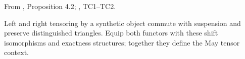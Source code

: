 \begin{definition}
\label{sem:Literature:may-tensor}
From \cite{Pst}, Proposition 4.2; \cite{May01}, TC1--TC2.\par

Left and right tensoring by a synthetic object commute with suspension and preserve distinguished triangles. Equip both functors with these shift isomorphisms and exactness structures; together they define the May tensor context.
\end{definition}

